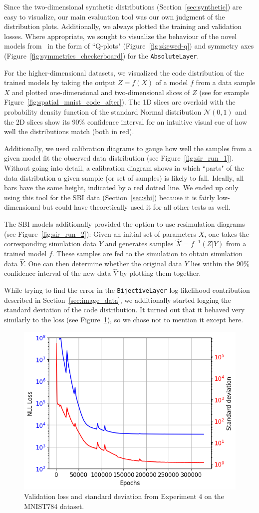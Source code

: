 Since the two-dimensional synthetic distributions (Section~\ref{sec:synthetic}) are easy to visualize, our main evaluation tool was our own judgment of the distribution plots. Additionally, we always plotted the training and validation losses. Where appropriate, we sought to visualize the behaviour of the novel models from~\cite{nielsen2020survae} in the form of ``Q-plots" (Figure~\ref{fig:skewed-q}) and symmetry axes (Figure~\ref{fig:symmetries_checkerboard}) for the \texttt{AbsoluteLayer}.

For the higher-dimensional datasets, we visualized the code distribution of the trained models by taking the output {$Z = f(X)$} of a model $f$ from a data sample $X$ and plotted one-dimensional and two-dimensional slices of $Z$ (see for example Figure~\ref{fig:spatial_mnist_code_after}). The 1D slices are overlaid with the probability density function of the standard Normal distribution $\mathcal{N}(0, 1)$ and the 2D slices show its 90\% confidence interval for an intuitive visual cue of how well the distributions match (both in red).

Additionally, we used calibration diagrams to gauge how well the samples from a given model fit the observed data distribution (see Figure~\ref{fig:sir_run_1}). Without going into detail, a calibration diagram shows in which ``parts" of the data distribution a given sample (or set of samples) is likely to fall. Ideally, all bars have the same height, indicated by a red dotted line. We ended up only using this tool for the SBI data (Section~\ref{sec:sbi}) because it is fairly low-dimensional but could have theoretically used it for all other tests as well.

The SBI models additionally provided the option to use resimulation diagrams (see Figure~\ref{fig:sir_run_2}): Given an initial set of parameters $X$, one takes the corresponding simulation data $Y$ and generates samples {$\hat{X} = f^{-1}(Z|Y)$} from a trained model $f$. These samples are fed to the simulation to obtain simulation data $\hat{Y}$. One can then determine whether the original data $Y$ lies within the 90\% confidence interval of the new data $\hat{Y}$ by plotting them together.

While trying to find the error in the \texttt{BijectiveLayer} log-likelihood contribution described in Section~\ref{sec:image_data}, we additionally started logging the standard deviation of the code distribution. It turned out that it behaved very similarly to the loss (see Figure~\ref{fig:mnist_run_4_loss_vs_sigma}), so we chose not to mention it except here.

\begin{figure}
\centering
\includegraphics[width=.7\textwidth]{images/mnist_maxpooling/run_4_loss_vs_sigma.png}
\caption{Validation loss and standard deviation from Experiment 4 on the MNIST784 dataset.}
\label{fig:mnist_run_4_loss_vs_sigma}
\end{figure}